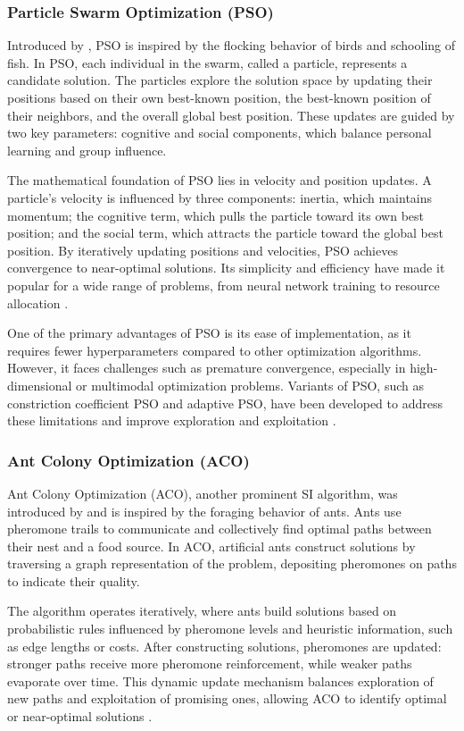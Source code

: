 \subsubsection*{Particle Swarm Optimization (PSO)} Introduced by \textcite{kennedy1995particle}, PSO is inspired by the flocking behavior of birds and schooling of fish. In PSO, each individual in the swarm, called a particle, represents a candidate solution. The particles explore the solution space by updating their positions based on their own best-known position, the best-known position of their neighbors, and the overall global best position. These updates are guided by two key parameters: cognitive and social components, which balance personal learning and group influence.

The mathematical foundation of PSO lies in velocity and position updates. A particle's velocity is influenced by three components: inertia, which maintains momentum; the cognitive term, which pulls the particle toward its own best position; and the social term, which attracts the particle toward the global best position. By iteratively updating positions and velocities, PSO achieves convergence to near-optimal solutions. Its simplicity and efficiency have made it popular for a wide range of problems, from neural network training to resource allocation \parencite{clerc2002particle}.

One of the primary advantages of PSO is its ease of implementation, as it requires fewer hyperparameters compared to other optimization algorithms. However, it faces challenges such as premature convergence, especially in high-dimensional or multimodal optimization problems. Variants of PSO, such as constriction coefficient PSO and adaptive PSO, have been developed to address these limitations and improve exploration and exploitation \parencite{shi1998modified}.

\subsubsection*{Ant Colony Optimization (ACO)}
Ant Colony Optimization (ACO), another prominent SI algorithm, was introduced by \textcite{dorigo1996ant} and is inspired by the foraging behavior of ants. Ants use pheromone trails to communicate and collectively find optimal paths between their nest and a food source. In ACO, artificial ants construct solutions by traversing a graph representation of the problem, depositing pheromones on paths to indicate their quality.

The algorithm operates iteratively, where ants build solutions based on probabilistic rules influenced by pheromone levels and heuristic information, such as edge lengths or costs. After constructing solutions, pheromones are updated: stronger paths receive more pheromone reinforcement, while weaker paths evaporate over time. This dynamic update mechanism balances exploration of new paths and exploitation of promising ones, allowing ACO to identify optimal or near-optimal solutions \parencite{dorigo2007ant}.

